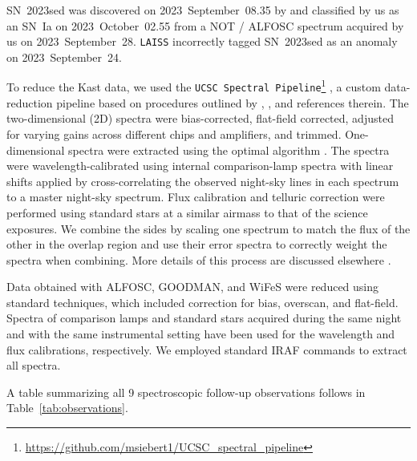 \documentclass[twocolumn]{aastex63}
\begin{document}
SN~2023sed was discovered on 2023~September~08.35 by \cite{ALeRCE2023sed} and classified by us as an SN~Ia on 2023~October~02.55 \citep{Angus2023sed} from a NOT / ALFOSC spectrum acquired by us on 2023~September~28. \texttt{LAISS} incorrectly tagged SN~2023sed as an anomaly on 2023~September~24. \par

To reduce the Kast data, we used the {\tt UCSC Spectral Pipeline}\footnote{\url{https://github.com/msiebert1/UCSC\_spectral\_pipeline}} \citep{Siebert20}, a custom data-reduction pipeline based on procedures outlined by \citet{Foley03}, \citet{Silverman2012}, and references therein.  The two-dimensional (2D) spectra were bias-corrected, flat-field corrected, adjusted for varying gains across different chips and amplifiers, and trimmed.  One-dimensional spectra were extracted using the optimal algorithm \citep{Horne86}.  The spectra were wavelength-calibrated using internal comparison-lamp spectra with linear shifts applied by cross-correlating the observed night-sky lines in each spectrum to a master night-sky spectrum.  Flux calibration and telluric correction were performed using standard stars at a similar airmass to that of the science exposures.  We combine the sides by scaling one spectrum to match the flux of the other in the overlap region and use their error spectra to correctly weight the spectra when combining.  More details of this process are discussed elsewhere \citep{Foley03, Silverman2012, Siebert20, Davis22}.

Data obtained with ALFOSC, GOODMAN, and WiFeS were reduced using standard techniques, which included correction for bias, overscan, and flat-field. Spectra of comparison lamps and standard stars acquired during the same night and with the same instrumental setting have been used for the wavelength and flux calibrations, respectively. We employed standard \textsc{IRAF} commands to extract all spectra.

A table summarizing all 9 spectroscopic follow-up observations follows in Table~\ref{tab:observations}.
\end{document}
